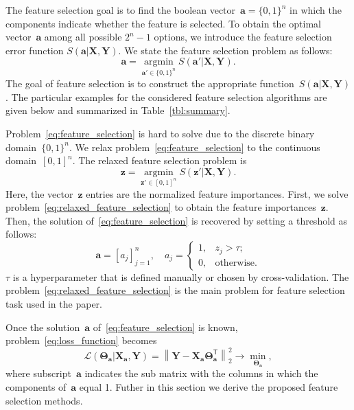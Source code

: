 \documentclass[preprint,authoryear,12pt]{elsarticle}
\theoremstyle{definition}
\newcommand{\ba}{\mathbf{a}}
\newcommand{\bz}{\mathbf{z}}
\newcommand{\bY}{\mathbf{Y}}
\newcommand{\bX}{\mathbf{X}}
\newcommand{\T}{\mathsf{T}}
\newcommand{\bTheta}{\boldsymbol{\Theta}}
\newcommand{\argmin}{\mathop{\arg \min}\limits}
\begin{document}
The feature selection goal is to find the boolean vector~$\ba = \{0, 1\}^n$ in which the components indicate whether the feature is selected. 
To obtain the optimal vector~$\ba$ among all possible $2^n - 1$ options, we introduce the feature selection error function $S(\ba | \bX, \bY)$. 
We state the feature selection problem as follows:
\begin{equation}
\ba = \argmin_{\ba' \in \{0, 1\}^n} S(\ba' | \bX, \bY).
\label{eq:feature_selection}
\end{equation}
The goal of feature selection is to construct the appropriate function~$S(\ba | \bX, \bY)$. The particular examples for the considered feature selection algorithms are given below and summarized in Table~\ref{tbl:summary}.

Problem~\eqref{eq:feature_selection} is hard to solve due to the discrete binary domain~$\{0, 1\}^n$. We relax problem~\eqref{eq:feature_selection} to the continuous domain~$[0, 1]^n$. The relaxed feature selection problem is
\begin{equation}
\bz = \argmin_{\bz' \in [0, 1]^n} S(\bz' | \bX, \bY).
\label{eq:relaxed_feature_selection}
\end{equation}
Here, the vector~$\bz$ entries are the normalized feature importances.
First, we solve problem~\eqref{eq:relaxed_feature_selection} to obtain the feature importances~$\bz$. 
Then, the solution of~\eqref{eq:feature_selection} is recovered by setting a threshold as follows:
\begin{equation*}
\ba = [a_j]_{j=1}^n, \quad 
a_j = \begin{cases}
1, & z_j > \tau; \\
0, & \text{otherwise}.
\end{cases}
\end{equation*}
$\tau$ is a hyperparameter that is defined manually or chosen by cross-validation. {\color{red} The problem~\eqref{eq:relaxed_feature_selection} is the main problem for feature selection task used in the paper.} 

Once the solution~$\ba$ of~\eqref{eq:feature_selection} is known, problem~\eqref{eq:loss_function} becomes
\begin{equation*}
\mathcal{L}(\bTheta_{\ba} | \bX_{\ba}, \bY) = {\left\| \mathbf{Y} - \bX_{\ba}\bTheta^{\T}_{\ba} \right\| }_2^2 \rightarrow\min_{\bTheta_{\ba}},
\end{equation*}
where subscript~$\ba$ indicates the sub matrix with the columns in which the components of~$\ba$ equal 1. {\color{red} Futher in this section we derive the proposed feature selection methods.}
\end{document}
